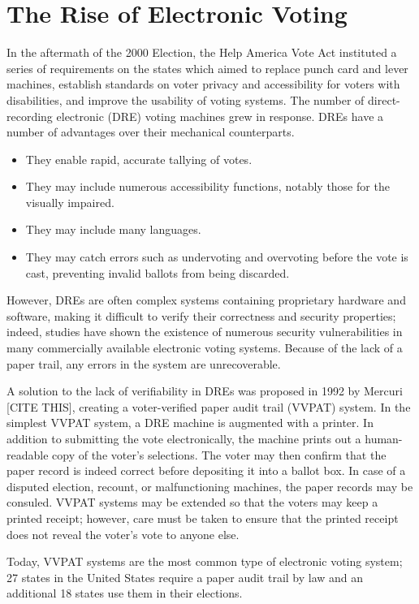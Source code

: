 \section{The Rise of Electronic Voting}

In the aftermath of the 2000 Election, the Help America Vote Act instituted a series of requirements on the states which aimed to replace punch card and lever machines, establish standards on voter privacy and accessibility for voters with disabilities, and improve the usability of voting systems. The number of direct-recording electronic (DRE) voting machines grew in response. DREs have a number of advantages over their mechanical counterparts.
\begin{itemize}
\item They enable rapid, accurate tallying of votes.
\item They may include numerous accessibility functions, notably those for the visually impaired.
\item They may include many languages.
\item They may catch errors such as undervoting and overvoting before the vote is cast, preventing invalid ballots from being discarded.
\end{itemize}

However, DREs are often complex systems containing proprietary hardware and software, making it difficult to verify their correctness and security properties; indeed, studies have shown the existence of numerous security vulnerabilities in many commercially available electronic voting systems. Because of the lack of a paper trail, any errors in the system are unrecoverable.

A solution to the lack of verifiability in DREs was proposed in 1992 by Mercuri [CITE THIS], creating a voter-verified paper audit trail (VVPAT) system. In the simplest VVPAT system, a DRE machine is augmented with a printer. In addition to submitting the vote electronically, the machine prints out a human-readable copy of the voter's selections. The voter may then confirm that the paper record is indeed correct before depositing it into a ballot box. In case of a disputed election, recount, or malfunctioning machines, the paper records may be consuled. VVPAT systems may be extended so that the voters may keep a printed receipt; however, care must be taken to ensure that the printed receipt does not reveal the voter's vote to anyone else.

Today, VVPAT systems are the most common type of electronic voting system; 27 states in the United States require a paper audit trail by law and an additional 18 states use them in their elections.

